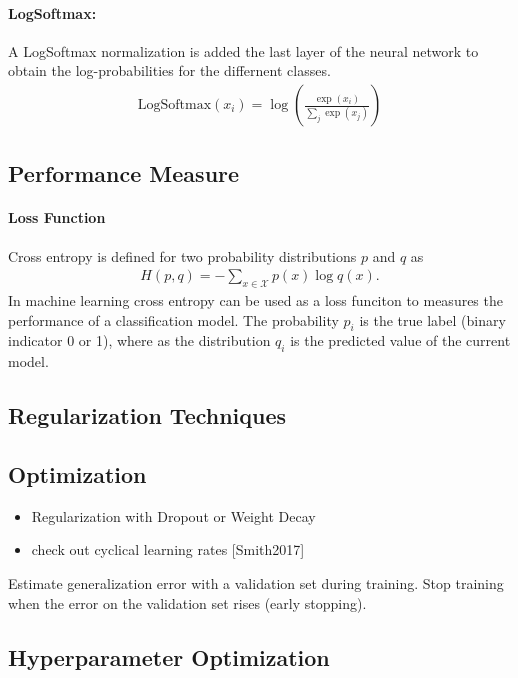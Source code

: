 \documentclass{scrartcl}
\begin{document}
\paragraph{LogSoftmax:}

A LogSoftmax normalization is added the last layer of the neural network to obtain the log-probabilities for the differnent classes.
\begin{align}
\text{LogSoftmax}(x_i) = \log\left(\frac{\exp{(x_i)}}{\sum_j \exp(x_j)}\right)
\end{align} 



\subsection{Performance Measure}

\paragraph{Loss Function}
Cross entropy is defined for two probability distributions $p$ and $q$ as
\begin{align}
H(p,q) = - \sum_{x \in \mathcal X} p(x) \log q(x).
\end{align} 
In machine learning cross entropy can be used as a loss funciton to measures the performance of a classification model. The probability $p_{i}$ is the true label (binary indicator 0 or 1), where as the distribution $q_{i}$ is the predicted value of the current model. 


\subsection{Regularization Techniques}


\subsection{Optimization}

\begin{itemize}
\item Regularization with Dropout or Weight Decay
\item check out cyclical learning rates \cite{Smith2017}[Smith2017]
\end{itemize}


Estimate generalization error with a validation set during training. Stop training when the error on the validation set rises (early stopping).


\subsection{Hyperparameter Optimization}
\end{document}
